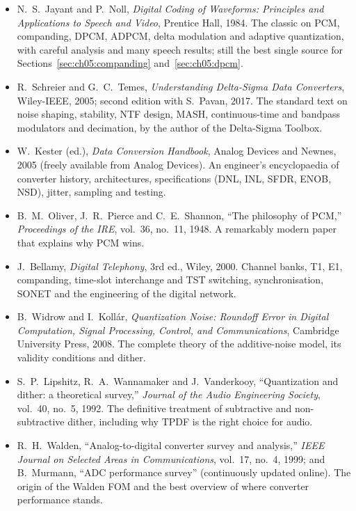 \furtherreading
\begin{itemize}
\item N.~S.~Jayant and P.~Noll, \emph{Digital Coding of Waveforms: Principles and Applications to
Speech and Video}, Prentice Hall, 1984. The classic on PCM, companding, DPCM, ADPCM, delta
modulation and adaptive quantization, with careful analysis and many speech results; still the best
single source for Sections~\ref{sec:ch05:companding} and~\ref{sec:ch05:dpcm}.
\item R.~Schreier and G.~C.~Temes, \emph{Understanding Delta-Sigma Data Converters}, Wiley-IEEE,
2005; second edition with S.~Pavan, 2017. The standard text on noise shaping, stability, NTF design,
MASH, continuous-time and bandpass modulators and decimation, by the author of the Delta-Sigma
Toolbox.
\item W.~Kester (ed.), \emph{Data Conversion Handbook}, Analog Devices and Newnes, 2005 (freely
available from Analog Devices). An engineer's encyclopaedia of converter history, architectures,
specifications (DNL, INL, SFDR, ENOB, NSD), jitter, sampling and testing.
\item B.~M.~Oliver, J.~R.~Pierce and C.~E.~Shannon, ``The philosophy of PCM,'' \emph{Proceedings of
the IRE}, vol.~36, no.~11, 1948. A remarkably modern paper that explains why PCM wins.
\item J.~Bellamy, \emph{Digital Telephony}, 3rd ed., Wiley, 2000. Channel banks, T1, E1, companding,
time-slot interchange and TST switching, synchronisation, SONET and the engineering of the digital
network.
\item B.~Widrow and I.~Koll\'ar, \emph{Quantization Noise: Roundoff Error in Digital Computation,
Signal Processing, Control, and Communications}, Cambridge University Press, 2008. The complete theory
of the additive-noise model, its validity conditions and dither.
\item S.~P.~Lipshitz, R.~A.~Wannamaker and J.~Vanderkooy, ``Quantization and dither: a theoretical
survey,'' \emph{Journal of the Audio Engineering Society}, vol.~40, no.~5, 1992. The definitive
treatment of subtractive and non-subtractive dither, including why TPDF is the right choice for audio.
\item R.~H.~Walden, ``Analog-to-digital converter survey and analysis,'' \emph{IEEE Journal on
Selected Areas in Communications}, vol.~17, no.~4, 1999; and B.~Murmann, ``ADC performance survey''
(continuously updated online). The origin of the Walden FOM and the best overview of where converter
performance stands.

\end{itemize}
